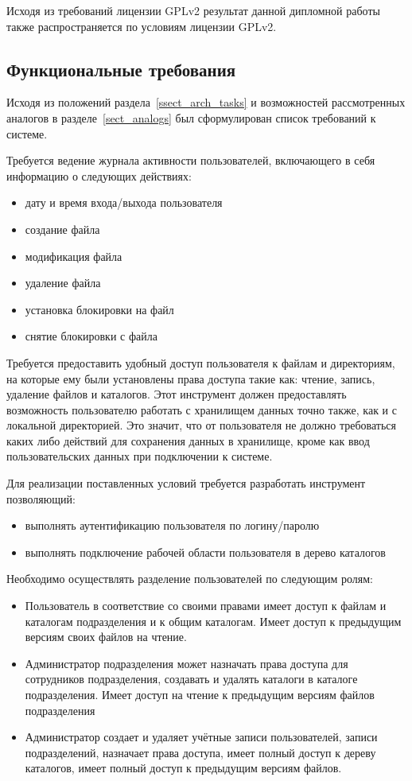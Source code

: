 \documentclass[utf8,usehyperref,12pt]{G7-32}
\begin{document}
Исходя из требований лицензии GPLv2 результат данной дипломной работы также распространяется по условиям лицензии GPLv2.

\subsection{Функциональные требования}\label{ssect_req}

Исходя из положений раздела~\ref{ssect_arch_tasks} и возможностей рассмотренных аналогов в разделе~\ref{sect_analogs} был сформулирован список требований к системе.

Требуется ведение журнала активности пользователей, включающего в себя информацию о следующих действиях: 
\begin{itemize}
\item дату и время входа/выхода пользователя
\item создание файла
\item модификация файла
\item удаление файла
\item установка блокировки на файл
\item снятие блокировки с файла
\end{itemize}

Требуется предоставить удобный доступ пользователя к файлам и директориям, на которые ему были установлены права доступа такие как: чтение, запись, удаление файлов и каталогов. Этот инструмент должен предоставлять возможность пользователю работать с хранилищем данных точно также, как и с локальной директорией. Это значит, что от пользователя не должно требоваться каких либо действий для сохранения данных в хранилище, кроме как ввод пользовательских данных при подключении к системе.

Для реализации поставленных условий требуется разработать инструмент позволяющий:	
\begin{itemize}
\item выполнять аутентификацию пользователя по логину/паролю	
\item выполнять подключение рабочей области пользователя в дерево каталогов
\end{itemize}

Необходимо осуществлять разделение пользователей по следующим ролям:	
\begin{itemize}
\item Пользователь 	в соответствие со своими правами имеет 	доступ к файлам и каталогам подразделения и к общим каталогам. Имеет доступ к предыдущим версиям своих файлов на чтение. 		
\item Администратор подразделения может назначать права доступа для сотрудников подразделения, создавать и удалять каталоги в каталоге подразделения. Имеет доступ на чтение к предыдущим версиям файлов подразделения	
\item Администратор создает и удаляет учётные записи пользователей, записи подразделений, назначает права доступа, имеет полный 	доступ к дереву каталогов, имеет полный 	доступ к предыдущим версиям файлов.
\end{itemize}
\end{document}
